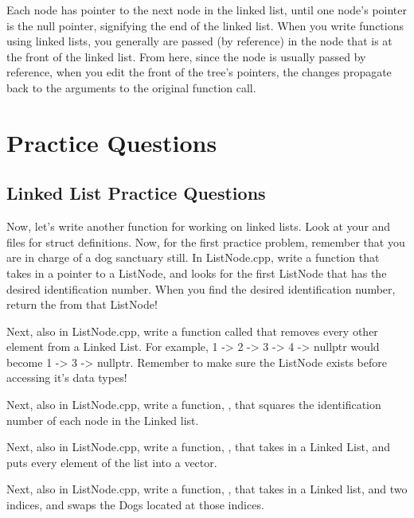 \documentclass{tufte-handout}
\begin{document}
Each node has pointer to the next node in the linked list, until one node's pointer is the null pointer, signifying the end of the linked list.
When you write functions using linked lists, you generally are passed (by reference) in the node that is at the front of the linked list.
From here, since the node is usually passed by reference, when you edit the front of the tree's pointers, the changes propagate back to the arguments to the original function call.
\section{Practice Questions}
\subsection{Linked List Practice Questions}

Now, let's write another function for working on linked lists.
Look at your  and  files for struct definitions.
Now, for the first practice problem, remember that you are in charge of a dog sanctuary still. 
In ListNode.cpp, write a function  that takes in a pointer to a ListNode, and looks for the first ListNode that has the desired identification number.
When you find the desired identification number, return the  from that ListNode!

Next, also in ListNode.cpp, write a function called \functionname{} that removes every other element from a Linked List.  
For example, 1 -> 2 -> 3 -> 4 -> nullptr would become 1 -> 3 -> nullptr.  
Remember to make sure the ListNode exists before accessing it's data types!

Next, also in ListNode.cpp, write a function, , that squares the identification number of each node in the Linked list.

Next, also in ListNode.cpp, write a function, , that takes in a Linked List, and puts every element of the list into a vector.

Next, also in ListNode.cpp, write a function, , that takes in a Linked list, and two indices, and swaps the Dogs located at those indices.  
\end{document}
